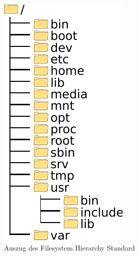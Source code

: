 \begin{figure}[h!]
   \begin{center}
      \includegraphics{images/vfs_structure}
   \end{center}
   \caption{Auszug des Filesystem Hierarchy Standard}
   \label{fig:vfs_structure}
\end{figure}


